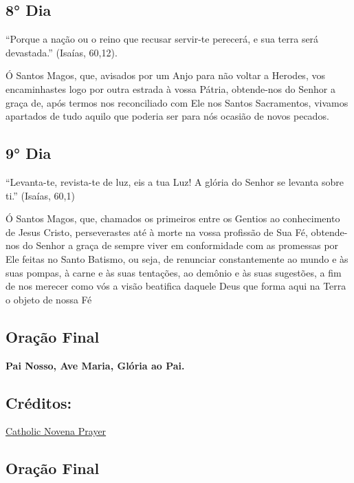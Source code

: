 \documentclass[18pt]{article}
\begin{document}
\textbf{}


\subsection{8° Dia}

“Porque a nação ou o reino que recusar servir-te perecerá, e sua terra será devastada.” (Isaías, 60,12).

Ó Santos Magos, que, avisados por um Anjo para não voltar a Herodes, vos encaminhastes logo por outra estrada à vossa Pátria, obtende-nos do Senhor a graça de, após termos nos reconciliado com Ele nos Santos Sacramentos, vivamos apartados de tudo aquilo que poderia ser para nós ocasião de novos pecados.


\textbf{}


\subsection{9° Dia}

“Levanta-te, revista-te de luz, eis a tua Luz! A glória do Senhor se levanta sobre ti.” (Isaías, 60,1)

Ó Santos Magos, que, chamados os primeiros entre os Gentios ao conhecimento de Jesus Cristo, perseverastes até à morte na vossa profissão de Sua Fé, obtende-nos do Senhor a graça de sempre viver em conformidade com as promessas por Ele feitas no Santo Batismo, ou seja, de renunciar constantemente ao mundo e às suas pompas, à carne e às suas tentações, ao demônio e às suas sugestões, a fim de nos merecer como vós a visão beatifica daquele Deus que forma aqui na Terra o objeto de nossa Fé 


\textbf{}

\subsection{Oração Final}\label{subsec:OraçãoFinal} %

\textbf{Pai Nosso, Ave Maria, Glória ao Pai.}

\subsection*{Créditos:}
\href{https://catholicnovenaprayer.com/novena-prayer-to-pope-st-sylvester-i/}{Catholic Novena Prayer}


\subsection{Oração Final}\label{sub:oracao_final} %
\end{document}
